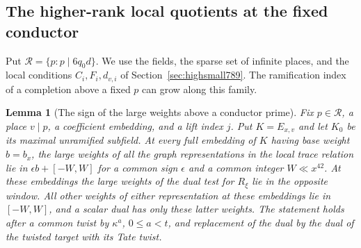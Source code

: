 \documentclass[a4paper,11pt]{article}
\newtheorem{lemma}[proposition]{Lemma}
\theoremstyle{definition}
\theoremstyle{remark}
\numberwithin{equation}{section}
\begin{document}
\subsection{The higher-rank local quotients at the fixed conductor}
\label{sec:highconductor790}
Put \(\mathcal R=\{p:p\mid 6q_0d\}\).
We use the fields, the sparse set of infinite places, and the
local conditions \(C_i,F_i,d_{v,i}\) of
Section~\ref{sec:highsmall789}. The ramification index of a
completion above a fixed \(p\) can grow along this family.

\begin{lemma}[The sign of the large weights above a conductor prime]
\leavevmode\label{lem:highsign790}
Fix \(p\in\mathcal R\), a place \(v\mid p\), a coefficient
embedding, and a lift index \(j\). Put \(K=E_{x,v}\) and let
\(K_0\) be its maximal unramified subfield. At every full
embedding of \(K\) having base weight \(b=b_x\), the large
weights of all the graph representations in the local
trace relation lie in \(\epsilon b+[-W,W]\) for a common
sign \(\epsilon\) and a common integer \(W\ll x^{42}\).
At these embeddings the large weights of the dual test for
\(R_\xi\) lie in the opposite window. All other weights
of either representation at these embeddings lie in
\([-W,W]\), and a scalar dual has only these latter weights.
The statement holds after a common twist by \(\kappa^a\),
\(0\le a<t\), and replacement of the dual by the dual of the
twisted target with its Tate twist.
\end{lemma}
\end{document}
